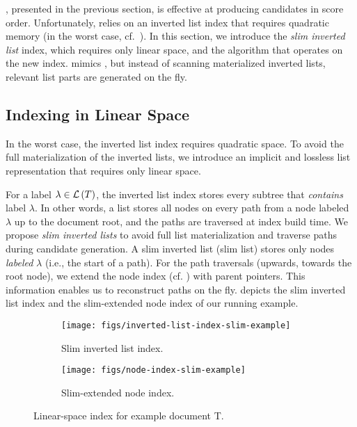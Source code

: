 
\cone{}, presented in the previous section, is effective at producing candidates in score order. Unfortunately, \cone{} relies on an inverted list index that requires quadratic memory (in the worst case, cf.\ ). In this section, we introduce the \emph{slim inverted list} index, which requires only linear space, and the \shincone{} algorithm that operates on the new index. \shincone{} mimics \cone{}, but instead of scanning materialized inverted lists, relevant list parts are generated on the fly.

\subsection{Indexing in Linear Space}
\label{subsec:a-memory-efficient-approach-indexing-in-linear-space}

In the worst case, the inverted list index requires quadratic space. To avoid the full materialization of the inverted lists, we introduce an implicit and lossless list representation that requires only linear space.

For a label $\lambda \in \mathcal{L} \left( T \right)$, the inverted list index stores every subtree that \emph{contains} label $\lambda$. In other words, a list stores all nodes on every path from a node labeled $\lambda$ up to the document root, and the paths are traversed at index build time. We propose \emph{slim inverted lists} to avoid full list materialization and traverse paths during candidate generation. A slim inverted list (slim list) stores only nodes \emph{labeled} $\lambda$ (i.e., the start of a path). For the path traversals (upwards, towards the root node), we extend the node index (cf. ) with parent pointers. This information enables us to reconstruct paths on the fly.  depicts the slim inverted list index and the slim-extended node index of our running example.

\begin{figure}[ht]
  \centering
  \begin{subfigure}[b]{0.5\textwidth}
    \centering
    \texttt{[image: figs/inverted-list-index-slim-example]}
    \caption{Slim inverted list index.}
    \label{fig:inverted-list-index-slim-example}
  \end{subfigure}
  \begin{subfigure}[b]{0.5\textwidth}
    \texttt{[image: figs/node-index-slim-example]}
    \caption{Slim-extended node index.}
    \label{fig:node-index-slim-example}
  \end{subfigure}
  \caption{Linear-space index for example document T.}
  \label{fig:a-memory-efficient-approach-index-example}
\end{figure}

